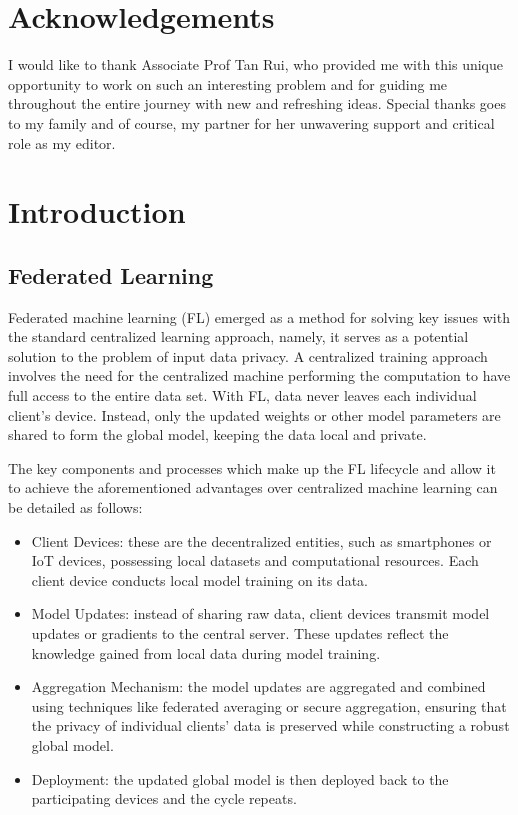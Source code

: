 \documentclass[12pt]{article}
\begin{document}
\section{Acknowledgements}
I would like to thank Associate Prof Tan Rui, who provided me with this unique opportunity to work
on such an interesting problem and for guiding me throughout the entire journey with new and
refreshing ideas. Special thanks goes to my family and of course, my
partner for her unwavering support and critical role as my editor.

\pagebreak
\tableofcontents
\listoffigures
\pagebreak

\section{Introduction}
\subsection{Federated Learning}
Federated machine learning (FL) emerged as a method for solving key issues with the standard centralized learning
approach, namely, it serves as a potential solution to the problem of input data privacy. A centralized training approach involves the need for the centralized
machine performing the computation to have full access to the entire data set. With FL, data never
leaves each individual client's device. Instead, only the updated weights or other model parameters are shared to form the
global model, keeping the data local and private.

The key components and processes which make up the FL lifecycle and allow it to achieve the
aforementioned advantages over centralized machine learning can be detailed as follows:
\begin{itemize}
  \item Client Devices: these are the decentralized entities, such as smartphones or IoT devices, possessing local datasets and computational resources. Each client device conducts local model training on its data.
  \item Model Updates: instead of sharing raw data, client devices transmit model updates or gradients to the central server. These updates reflect the knowledge gained from local data during model training.
  \item Aggregation Mechanism: the model updates are aggregated and combined using techniques like federated averaging or secure aggregation, ensuring that the privacy of individual clients' data is preserved while constructing a robust global model.
  \item Deployment: the updated global model is then deployed back to the participating devices and
    the cycle repeats.
\end{itemize}
\end{document}
